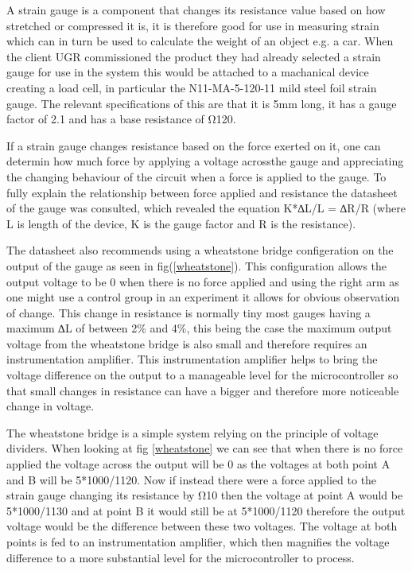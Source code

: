 A strain gauge is a component that changes its resistance value based on how stretched or compressed it is, it is therefore good for use in measuring strain which can in turn be used to calculate the weight of an object e.g. a car. When the client UGR commissioned the product they had already selected a strain gauge for use in the system this would be attached to a machanical device creating a load cell, in particular the N11-MA-5-120-11 mild steel foil strain gauge. The relevant specifications of this are that it is 5mm long, it has a gauge factor of 2.1 and has a base resistance of Ω120.

If a strain gauge changes resistance based on the force exerted on it, one can determin how much force by applying a voltage acrossthe gauge and appreciating the changing behaviour of the circuit when a force is applied to the gauge. To fully explain the relationship between force applied and resistance the datasheet of the gauge was consulted, which revealed the equation K*∆L/L = ∆R/R (where L is length of the device, K is the gauge factor and R is the resistance).  

The datasheet also recommends using a wheatstone bridge configeration on the output of the gauge as seen in fig(\ref{wheatstone}). This configuration allows the output voltage to be 0 when there is no force applied and using the right arm as one might use a control group in an experiment it allows for obvious observation of change. This change in resistance is normally tiny most gauges having a maximum ∆L of between 2\% and 4\%, this being the case the maximum output voltage from the wheatstone bridge is also small and therefore requires an instrumentation amplifier. This instrumentation amplifier helps to bring the voltage difference on the output to a manageable level for the microcontroller so that small changes in resistance can have a bigger and therefore more noticeable change in voltage. 

The wheatstone bridge is a simple system relying on the principle of voltage dividers. When looking at fig \ref{wheatstone} we can see that when there is no force applied the voltage across the output will be 0 as the voltages at both point A and B will be 5*1000/1120. Now if instead there were a force applied to the strain gauge changing its resistance by Ω10 then the voltage at point A would be 5*1000/1130 and at point B it would still be at 5*1000/1120 therefore the output voltage would be the difference between these two voltages. The voltage at both points is fed to an instrumentation amplifier, which then magnifies the voltage difference to a more substantial level for the microcontroller to process. 

